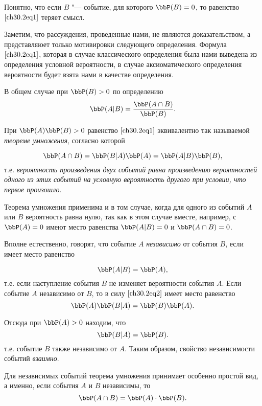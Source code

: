 Понятно, что если $B$ "--- событие, для которого $\bbP(B)=0$, то равенство~$\eqref{ch30.2eq1}$ теряет смысл.

Заметим, что рассуждения, проведенные нами, не являются доказательством, а представляюет только мотивировки следующего определения.
Формула $\eqref{ch30.2eq1}$, которая в случае классического определения была нами выведена из определения условной вероятности, в случае аксиоматического определения вероятности будет взята нами в качестве определения. 
\begin{defn} В общем случае при $\bbP(B) > 0$ по определению
$$
\bbP(A|B) = \frac{\bbP(A\cap B)}{\bbP(B)}.
$$
\end{defn}

При $\bbP(A)\bbP(B) > 0$ равенство $\eqref{ch30.2eq1}$ эквивалентно так называемой \textit{теореме умножения}, согласно которой

\begin{equation} \label{ch30.2eq2}
\bbP(A\cap B) = \bbP(B|A)\bbP(A) = \bbP(A|B)\bbP(B),
\end{equation}
т.е. \textit{вероятность произведения двух событий равна произведению вероятностей одного из этих событий на условную вероятность другого при условии, что первое произошло}.

Теорема умножения применима и в том случае, когда для одного из событий $A$ или $B$ вероятность равна нулю, так как в этом случае вместе, например, с $\bbP(A) = 0$ имеют место равенства $\bbP(A|B) = 0$ и $\bbP(A\cap B) = 0$.

Вполне естественно, говорят, что событие $A$ \textit{независимо} от события $B$, если имеет место равенство

\begin{equation} \label{ch30.2eq3}
\bbP(A|B) = \bbP(A),
\end{equation}
т.е. если наступление события $B$ не изменяет вероятности события $A$. Если событие $A$ независимо от $B$, то в силу $\eqref{ch30.2eq2}$ имеет место равенство
$$
\bbP(A)\bbP(B|A) = \bbP(B)\bbP(A).
$$

Отсюда при $\bbP(A) > 0$ находим, что
\begin{equation} \label{ch30.2eq4}
\bbP(B|A) = \bbP(B).
\end{equation}
т.е. событие $B$ также независимо от $A$. Таким образом, свойство независимости событий \textit{взаимно}.

Для независимых событий теорема умножения принимает особенно простой вид, а именно, если события $A$ и $B$ независимы, то
$$
\bbP(A\cap B) = \bbP(A) \cdot \bbP(B).
$$

